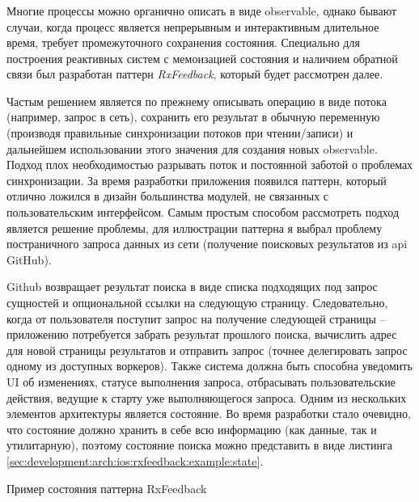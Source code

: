 \subsubsection{}
\label{sec:development:arch:ios:rxfeedback}

Многие процессы можно органично описать в виде \gls{observable}, однако бывают случаи, когда процесс является непрерывным и интерактивным длительное время, требует промежуточного сохранения состояния. Специально для построения реактивных систем с мемоизацией состояния и наличием обратной связи был разработан паттерн \emph{RxFeedback}, который будет рассмотрен далее.

Частым решением является по прежнему описывать операцию в виде потока (например, запрос в сеть), сохранить его результат в обычную переменную (производя правильные синхронизации потоков при чтении/записи) и дальнейшем использовании этого значения для создания новых \gls{observable}. Подход плох необходимостью разрывать поток и постоянной заботой о проблемах синхронизации. За время разработки приложения появился паттерн, который отлично ложился в дизайн большинства модулей, не связанных с пользовательским интерфейсом.
Самым простым способом рассмотреть подход является решение проблемы, для иллюстрации паттерна я выбрал проблему постраничного запроса данных из сети (получение поисковых результатов из \gls{api} GitHub).

Github возвращает результат поиска в виде списка подходящих под запрос сущностей и опциональной ссылки на следующую страницу. Следовательно, когда от пользователя поступит запрос на получение следующей страницы -- приложению потребуется забрать результат прошлого поиска, вычислить адрес для новой страницы результатов и отправить запрос (точнее делегировать запрос одному из доступных воркеров). Также система должна быть способна уведомить UI об изменениях, статусе выполнения запроса, отбрасывать пользовательские действия, ведущие к старту уже выполняющегося запроса.
Одним из нескольких элементов архитектуры является состояние. Во время разработки стало очевидно, что состояние должно хранить в себе всю информацию (как данные, так и утилитарную), поэтому состояние поиска можно представить в виде листинга \ref{sec:development:arch:ios:rxfeedback:example:state}.

\begin{code}
  
   \caption{Пример состояния паттерна RxFeedback}
   \label{sec:development:arch:ios:rxfeedback:example:state}
\end{code}


